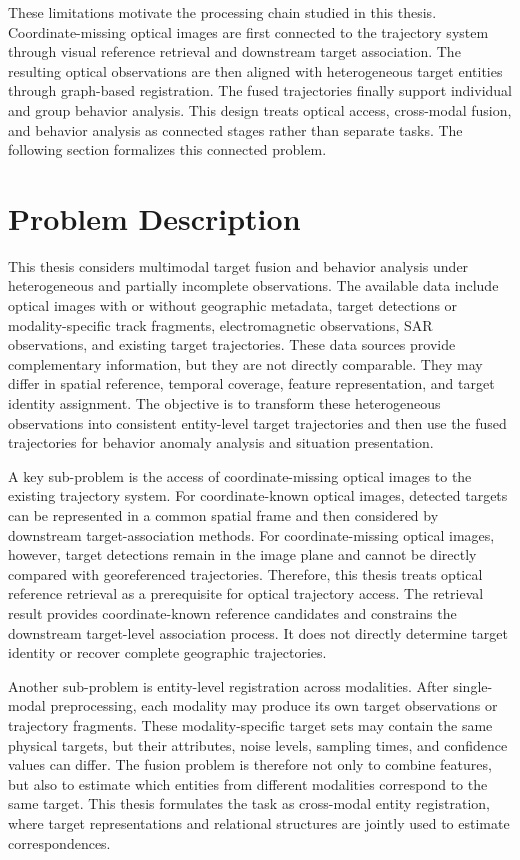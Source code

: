 These limitations motivate the processing chain studied in this thesis. Coordinate-missing optical images are first connected to the trajectory system through visual reference retrieval and downstream target association. The resulting optical observations are then aligned with heterogeneous target entities through graph-based registration. The fused trajectories finally support individual and group behavior analysis. This design treats optical access, cross-modal fusion, and behavior analysis as connected stages rather than separate tasks. The following section formalizes this connected problem.

\section{Problem Description}
This thesis considers multimodal target fusion and behavior analysis under heterogeneous and partially incomplete observations. The available data include optical images with or without geographic metadata, target detections or modality-specific track fragments, electromagnetic observations, SAR observations, and existing target trajectories. These data sources provide complementary information, but they are not directly comparable. They may differ in spatial reference, temporal coverage, feature representation, and target identity assignment. The objective is to transform these heterogeneous observations into consistent entity-level target trajectories and then use the fused trajectories for behavior anomaly analysis and situation presentation.

A key sub-problem is the access of coordinate-missing optical images to the existing trajectory system. For coordinate-known optical images, detected targets can be represented in a common spatial frame and then considered by downstream target-association methods. For coordinate-missing optical images, however, target detections remain in the image plane and cannot be directly compared with georeferenced trajectories. Therefore, this thesis treats optical reference retrieval as a prerequisite for optical trajectory access. The retrieval result provides coordinate-known reference candidates and constrains the downstream target-level association process. It does not directly determine target identity or recover complete geographic trajectories.

Another sub-problem is entity-level registration across modalities. After single-modal preprocessing, each modality may produce its own target observations or trajectory fragments. These modality-specific target sets may contain the same physical targets, but their attributes, noise levels, sampling times, and confidence values can differ. The fusion problem is therefore not only to combine features, but also to estimate which entities from different modalities correspond to the same target. This thesis formulates the task as cross-modal entity registration, where target representations and relational structures are jointly used to estimate correspondences.

